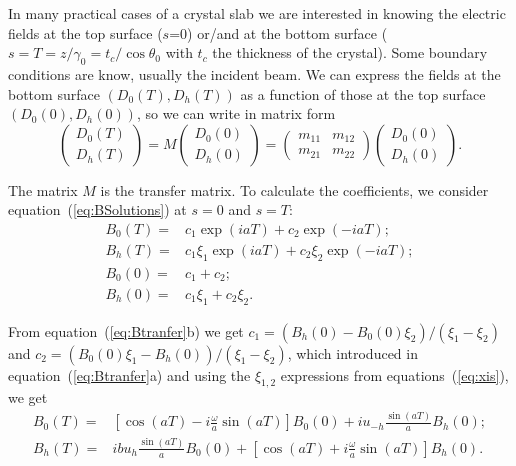 \documentclass[preprint]{iucr}              %
\begin{document}
In many practical cases of a crystal slab we are interested in knowing the electric fields at the top surface ($s$=0) or/and at the bottom surface ($s=T=z/\gamma_0=t_c/\cos\theta_0$ with $t_c$ the thickness of the crystal). Some boundary conditions are know, usually the incident beam.   
We can express the fields at the bottom surface $(D_0(T),D_h(T))$ as a function of those at the top surface $(D_0(0),D_h(0))$, so we can write in matrix form
\begin{equation}\label{eq:Mtransfer}
    \begin{pmatrix}
    D_0(T)\\
    D_h(T)
    \end{pmatrix}
    =
    M
        \begin{pmatrix}
    D_0(0) \\
    D_h(0)
    \end{pmatrix}
    =
    \begin{pmatrix}
    m_{11} & m_{12}\\
    m_{21} & m_{22}
    \end{pmatrix}
    \begin{pmatrix}
    D_0(0) \\
    D_h(0)
    \end{pmatrix}.
\end{equation}

The matrix $M$ is the transfer matrix. To calculate  the coefficients, we consider equation~(\ref{eq:BSolutions}) at $s=0$ and $s=T$: 
\begin{subequations}
\label{eq:Btranfer}
\begin{align}
B_0(T) = &c_1 \exp(i a T) + c_2 \exp(-i a T) ; \\
B_h(T) = &c_1 \xi_1 \exp(i a T) + c_2 \xi_2 \exp(-i a T) ; \nonumber \\
B_0(0) = &c_1 + c_2  ; \\
B_h(0) = &c_1 \xi_1 + c_2 \xi_2.  \nonumber  
\end{align}
\end{subequations}

From equation~(\ref{eq:Btranfer}b) we get $c_1=(B_h(0)-B_0(0)\xi_2)/(\xi_1-\xi_2)$ and $c_2=(B_0(0)\xi_1-B_h(0))/(\xi_1-\xi_2)$, which introduced in equation~(\ref{eq:Btranfer}a) and using the $\xi_{1,2}$ expressions from equations~(\ref{eq:xis}), we get
\begin{subequations}
\label{eq:BtranferFinal}
\begin{align}
B_0(T) = & \left[\cos(aT)-i\frac{\omega}{a}\sin(aT)\right] B_0(0) + i u_{-h}\frac{\sin(aT)}{a} B_h(0); \\
B_h(T) = & i b u_h \frac{\sin(aT)}{a} B_0(0) + \left[ \cos(aT)+i\frac{\omega}{a}\sin(aT)\right] B_h(0).
\end{align}
\end{subequations}
\end{document}
